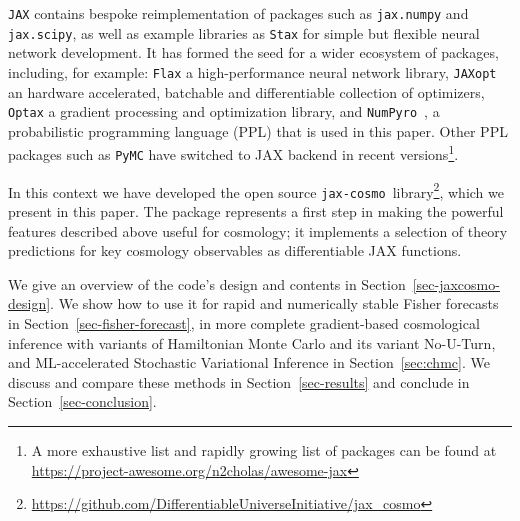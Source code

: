 \documentclass[twocolumn,twocolappendix,nofootinbib,iop]{openjournal}
\newcommand{\numpyro}{\texttt{NumPyro}}
\newcommand{\jaxcosmo}{\texttt{jax-cosmo}}
\begin{document}
\texttt{JAX} contains bespoke reimplementation of packages such as \texttt{jax.numpy} and \texttt{jax.scipy}, as well as example libraries as \texttt{Stax} for simple but flexible neural network development. It has formed the seed for a wider ecosystem of packages, including, for example: 
\texttt{Flax} \citep{flax2020github} a high-performance neural network library, \texttt{JAXopt} \citep{jaxopt_implicit_diff} an hardware accelerated, batchable and differentiable collection of optimizers, \texttt{Optax} \citep{optax2020github} a gradient processing and optimization library, and \numpyro\ \citep{phan2019composable,bingham2019pyro}, a probabilistic programming language (PPL) that is used in this paper. Other PPL packages such as \texttt{PyMC} \citep{Salvatier2016} have switched to JAX backend in recent versions\footnote{A more exhaustive list and rapidly growing list of packages can be found at \url{https://project-awesome.org/n2cholas/awesome-jax}}.


In this context we have developed the open source \jaxcosmo\ library\footnote{\url{https://github.com/DifferentiableUniverseInitiative/jax_cosmo}}, which we present in this paper. The package represents a first step in making the powerful features described above useful for cosmology; it implements a selection of theory predictions for key cosmology observables as differentiable JAX functions.


We give an overview of the code's design and contents in Section~\ref{sec-jaxcosmo-design}. We show how to use it for rapid and numerically stable Fisher forecasts in Section~\ref{sec-fisher-forecast}, in more complete gradient-based cosmological inference with variants of Hamiltonian Monte Carlo and its variant No-U-Turn, and ML-accelerated Stochastic Variational Inference in Section~\ref{sec:chmc}. We discuss and compare these methods in Section~\ref{sec-results} and conclude in Section~\ref{sec-conclusion}.
\end{document}
